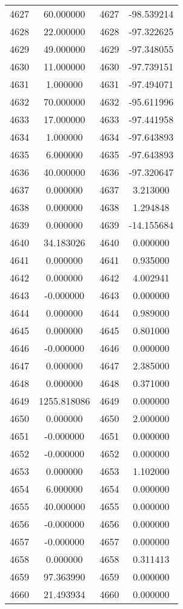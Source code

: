 \documentclass[12pt]{article}
\begin{document}
\begin{longtable}{@{}cccc@{}}
4627 & 60.000000 & 4627 & -98.539214 \\
4628 & 22.000000 & 4628 & -97.322625 \\
4629 & 49.000000 & 4629 & -97.348055 \\
4630 & 11.000000 & 4630 & -97.739151 \\
4631 & 1.000000 & 4631 & -97.494071 \\
4632 & 70.000000 & 4632 & -95.611996 \\
4633 & 17.000000 & 4633 & -97.441958 \\
4634 & 1.000000 & 4634 & -97.643893 \\
4635 & 6.000000 & 4635 & -97.643893 \\
4636 & 40.000000 & 4636 & -97.320647 \\
4637 & 0.000000 & 4637 & 3.213000 \\
4638 & 0.000000 & 4638 & 1.294848 \\
4639 & 0.000000 & 4639 & -14.155684 \\
4640 & 34.183026 & 4640 & 0.000000 \\
4641 & 0.000000 & 4641 & 0.935000 \\
4642 & 0.000000 & 4642 & 4.002941 \\
4643 & -0.000000 & 4643 & 0.000000 \\
4644 & 0.000000 & 4644 & 0.989000 \\
4645 & 0.000000 & 4645 & 0.801000 \\
4646 & -0.000000 & 4646 & 0.000000 \\
4647 & 0.000000 & 4647 & 2.385000 \\
4648 & 0.000000 & 4648 & 0.371000 \\
4649 & 1255.818086 & 4649 & 0.000000 \\
4650 & 0.000000 & 4650 & 2.000000 \\
4651 & -0.000000 & 4651 & 0.000000 \\
4652 & -0.000000 & 4652 & 0.000000 \\
4653 & 0.000000 & 4653 & 1.102000 \\
4654 & 6.000000 & 4654 & 0.000000 \\
4655 & 40.000000 & 4655 & 0.000000 \\
4656 & -0.000000 & 4656 & 0.000000 \\
4657 & -0.000000 & 4657 & 0.000000 \\
4658 & 0.000000 & 4658 & 0.311413 \\
4659 & 97.363990 & 4659 & 0.000000 \\
4660 & 21.493934 & 4660 & 0.000000 \\

\end{longtable}
\end{document}
